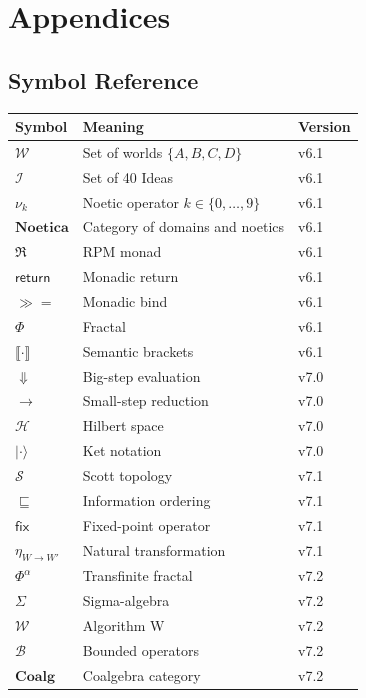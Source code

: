 \documentclass[11pt,twoside,openright]{book}
\theoremstyle{definition}
\theoremstyle{plain}
\theoremstyle{remark}
\newcommand{\sem}[1]{\llbracket #1 \rrbracket}
\newcommand{\Worlds}{\mathcal{W}}
\newcommand{\Ideas}{\mathcal{I}}
\newcommand{\Noetica}{\mathbf{Noetica}}
\newcommand{\noe}[1]{\nu_{#1}}
\newcommand{\RPM}{\mathfrak{R}}
\newcommand{\rpmret}{\mathsf{return}}
\newcommand{\rpmbind}{\mathbin{\gg\!=}}
\newcommand{\Frac}{\Phi}
\newcommand{\bigstep}{\Downarrow}
\newcommand{\smallstep}{\rightarrow}
\newcommand{\Hspace}{\mathcal{H}}
\newcommand{\qket}[1]{|#1\rangle}
\newcommand{\Scott}{\mathscr{S}}
\newcommand{\sqleq}{\sqsubseteq}
\newcommand{\fix}{\mathsf{fix}}
\newcommand{\NatTrans}[2]{\eta_{#1 \to #2}}
\newcommand{\TransFrac}[1]{\Phi^{#1}}        %
\newcommand{\SigAlg}{\Sigma}                 %
\newcommand{\AlgW}{\mathcal{W}}              %
\newcommand{\BoundedOp}{\mathcal{B}}         %
\newcommand{\Coalg}{\mathbf{Coalg}}          %
\begin{document}
\part{Appendices}

\chapter{Symbol Reference}
\label{app:symbols}

\begin{center}
\begin{longtable}{lll}
\toprule
\textbf{Symbol} & \textbf{Meaning} & \textbf{Version} \\
\midrule
\endhead
$\Worlds$ & Set of worlds $\{A, B, C, D\}$ & v6.1 \\
$\Ideas$ & Set of 40 Ideas & v6.1 \\
$\noe{k}$ & Noetic operator $k \in \{0, \ldots, 9\}$ & v6.1 \\
$\Noetica$ & Category of domains and noetics & v6.1 \\
$\RPM$ & RPM monad & v6.1 \\
$\rpmret$ & Monadic return & v6.1 \\
$\rpmbind$ & Monadic bind & v6.1 \\
$\Frac$ & Fractal & v6.1 \\
$\sem{\cdot}$ & Semantic brackets & v6.1 \\
$\bigstep$ & Big-step evaluation & v7.0 \\
$\smallstep$ & Small-step reduction & v7.0 \\
$\Hspace$ & Hilbert space & v7.0 \\
$\qket{\cdot}$ & Ket notation & v7.0 \\
$\Scott$ & Scott topology & v7.1 \\
$\sqleq$ & Information ordering & v7.1 \\
$\fix$ & Fixed-point operator & v7.1 \\
$\NatTrans{W}{W'}$ & Natural transformation & v7.1 \\
$\TransFrac{\alpha}$ & Transfinite fractal & v7.2 \\
$\SigAlg$ & Sigma-algebra & v7.2 \\
$\AlgW$ & Algorithm W & v7.2 \\
$\BoundedOp$ & Bounded operators & v7.2 \\
$\Coalg$ & Coalgebra category & v7.2 \\
\bottomrule
\end{longtable}
\end{center}
\end{document}
